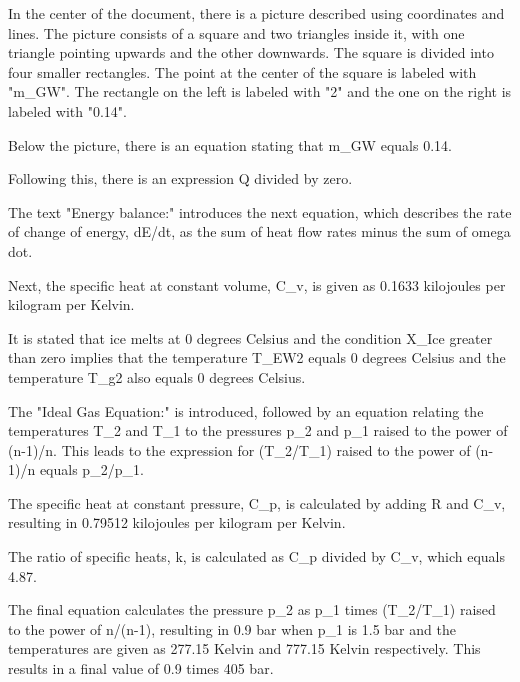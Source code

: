In the center of the document, there is a picture described using coordinates and lines. The picture consists of a square and two triangles inside it, with one triangle pointing upwards and the other downwards. The square is divided into four smaller rectangles. The point at the center of the square is labeled with "m_GW". The rectangle on the left is labeled with "2" and the one on the right is labeled with "0.14".

Below the picture, there is an equation stating that m_GW equals 0.14.

Following this, there is an expression Q divided by zero.

The text "Energy balance:" introduces the next equation, which describes the rate of change of energy, dE/dt, as the sum of heat flow rates minus the sum of omega dot.

Next, the specific heat at constant volume, C_v, is given as 0.1633 kilojoules per kilogram per Kelvin.

It is stated that ice melts at 0 degrees Celsius and the condition X_Ice greater than zero implies that the temperature T_EW2 equals 0 degrees Celsius and the temperature T_g2 also equals 0 degrees Celsius.

The "Ideal Gas Equation:" is introduced, followed by an equation relating the temperatures T_2 and T_1 to the pressures p_2 and p_1 raised to the power of (n-1)/n. This leads to the expression for (T_2/T_1) raised to the power of (n-1)/n equals p_2/p_1.

The specific heat at constant pressure, C_p, is calculated by adding R and C_v, resulting in 0.79512 kilojoules per kilogram per Kelvin.

The ratio of specific heats, k, is calculated as C_p divided by C_v, which equals 4.87.

The final equation calculates the pressure p_2 as p_1 times (T_2/T_1) raised to the power of n/(n-1), resulting in 0.9 bar when p_1 is 1.5 bar and the temperatures are given as 277.15 Kelvin and 777.15 Kelvin respectively. This results in a final value of 0.9 times 405 bar.